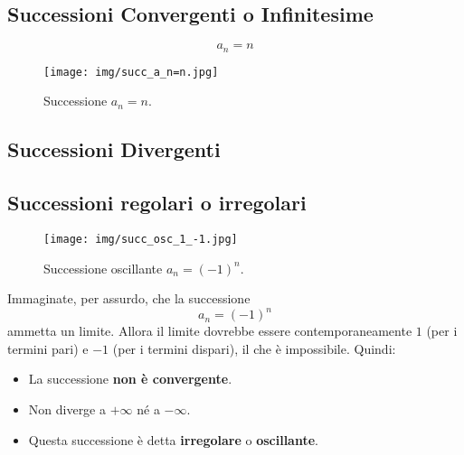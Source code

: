 \subsection{Successioni Convergenti o Infinitesime}\label{successioni-convergenti-o-infinitesime}


\[a_n = n\]
\begin{figure}[H]
    \centering
    \texttt{[image: img/succ\_a\_n=n.jpg]}
    \caption{Successione $a_n=n$.}
\end{figure}

\subsection{Successioni Divergenti}\label{successioni-divergenti}


\subsection{Successioni regolari o irregolari}\label{successioni-regolari-o-irregolari}

\begin{figure}[H]
    \centering
    \texttt{[image: img/succ\_osc\_1\_-1.jpg]}
    \caption{Successione oscillante $a_n = (-1)^n$.}
\end{figure}
Immaginate, per assurdo, che la successione
\[a_n = (-1)^n\]
ammetta un limite.
Allora il limite dovrebbe essere contemporaneamente $1$ (per i termini pari) e $-1$ (per i termini dispari), il che è impossibile.
Quindi:
\begin{itemize}
    \item La successione \textbf{non è convergente}.
    \item Non diverge a $+\infty$ né a $-\infty$.
    \item Questa successione è detta \textbf{irregolare} o \textbf{oscillante}.
\end{itemize}

